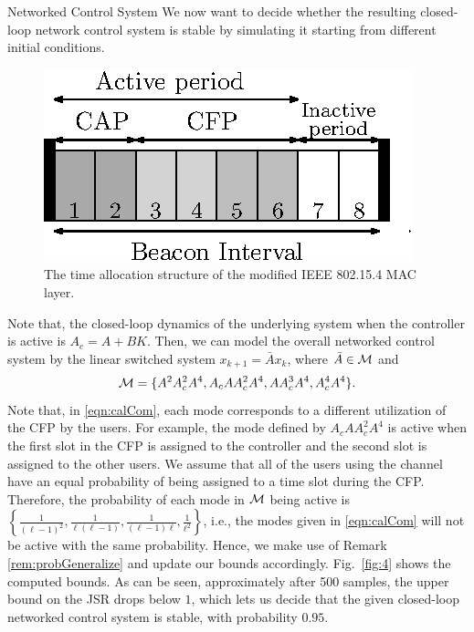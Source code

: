 \begin{subsection}{Networked Control System}
We now want to decide whether the resulting closed-loop network control system is stable by simulating it starting from different initial conditions. 
\begin{figure}
\begin{center}
\includegraphics[scale= 1.5]{comNetwork.eps}
\end{center}
\caption{The time allocation structure of the modified IEEE 802.15.4 MAC layer.}
\label{comExample}
\end{figure}

Note that, the closed-loop dynamics of the underlying system when the controller is active is $A_c = A+BK$. Then, we can model the overall networked control system by the linear switched system $x_{k+1} = \bar{A}x_k$, where $\bar{A} \in \mathcal{M}$ and
\begin{equation}\label{eqn:calCom}\mathcal{M} = \{A^2A_c^2A^4, A_cAA_c^2A^4,AA_c^3A^4, A_c^4A^4\}.
\end{equation}
Note that, in \eqref{eqn:calCom}, each mode corresponds to a different utilization of the CFP by the users. For example, the mode defined by $A_cAA_c^2A^4$ is active when the first slot in the CFP is assigned to the controller and the second slot is assigned to the other users. We assume that all of the users using the channel have an equal probability of being assigned to a time slot during the CFP. Therefore, the probability of each mode in $\mathcal{M}$ being active is $\left\{\frac{1}{(\ell-1)^2}, \frac{1}{\ell(\ell-1)}, \frac{1}{(\ell-1)\ell}, \frac{1}{\ell^2}\right\}$, i.e., the modes given in \eqref{eqn:calCom} will not be active with the same probability. Hence, we make use of Remark \ref{rem:probGeneralize} and update our bounds accordingly. Fig.~\ref{fig:4} shows the computed bounds. As can be seen, approximately after 500 samples,  the upper bound on the JSR drops below $1$, which lets us decide that the given closed-loop networked control system is stable, with probability $0.95$.


\end{subsection}
